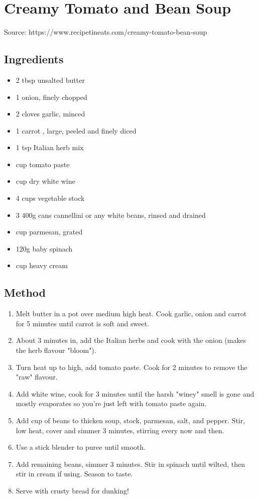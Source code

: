 \clearpage
\section{Creamy Tomato and Bean Soup}


Source: https://www.recipetineats.com/creamy-tomato-bean-soup

\subsection{Ingredients}

\begin{itemize}
    \item 2 tbsp unsalted butter
    \item 1 onion, finely chopped
    \item 2 cloves garlic, minced
    \item 1 carrot , large, peeled and finely diced
    \item 1 tsp Italian herb mix
    \item {} cup tomato paste
    \item {} cup dry white wine
    \item 4 cups vegetable stock
    \item 3 400g cans cannellini or any white beans, rinsed and drained
    \item {} cup parmesan, grated
    \item 120g baby spinach
    \item {} cup heavy cream
\end{itemize}

\subsection{Method}

\begin{enumerate}
    \item Melt butter in a pot over medium high heat. Cook garlic, onion and carrot for 5 minutes until carrot is soft and sweet.
    \item About 3 minutes in, add the Italian herbs and cook with the onion (makes the herb flavour "bloom").
    \item Turn heat up to high, add tomato paste. Cook for 2 minutes to remove the "raw" flavour.
    \item Add white wine, cook for 3 minutes until the harsh "winey" smell is gone and mostly evaporates so you're just left with tomato paste again.
    \item Add  cup of beans to thicken soup, stock, parmesan, salt, and pepper. Stir, low heat, cover and simmer 3 minutes, stirring every now and then.
    \item Use a stick blender to puree until smooth.
    \item Add remaining beans, simmer 3 minutes. Stir in spinach until wilted, then stir in cream if using. Season to taste.
    \item Serve with crusty bread for dunking!
\end{enumerate}
